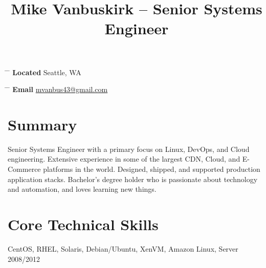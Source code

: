 \documentclass[10pt]{article} %
\begin{document}

\title{Mike Vanbuskirk -- Senior Systems Engineer} %


\parbox{0.5\textwidth}{ %
\begin{tabbing} %
\hspace{3cm} \= \hspace{4cm} \= \kill %
{\bf Located} \> Seattle, WA\\ %
\end{tabbing}}
\hfill %
\parbox{0.5\textwidth}{ %
\begin{tabbing} %
\hspace{3cm} \= \hspace{4cm} \= \kill %
{\bf Email} \> \href{mailto:mvanbus43@gmail.com}{mvanbus43@gmail.com} \\ %
\end{tabbing}}


\section{Summary}
  Senior Systems Engineer with a primary focus on Linux, DevOps, and Cloud engineering. Extensive experience in some of the largest CDN, Cloud, and E-Commerce platforms in the world. Designed, shipped, and supported production application stacks. Bachelor's degree holder who is passionate about technology and automation, and loves learning new things.

\section{Core Technical Skills}

{
CentOS, RHEL, Solaris, Debian/Ubuntu, XenVM, Amazon Linux, Server 2008/2012
}
\end{document}

